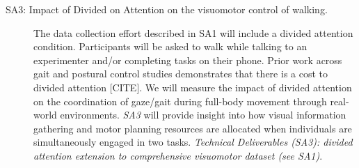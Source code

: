 \begin{description}
    \item[SA3: Impact of Divided on Attention on the visuomotor control of walking.] {The data collection effort described in SA1 will include a divided attention condition. Participants will be asked to walk while talking to an experimenter and/or completing tasks on their phone.  Prior work across gait and postural control studies demonstrates that there is a cost to divided attention [CITE]. We will measure the impact of divided attention on the coordination of gaze/gait during full-body movement through real-world environments. \textit{SA3} will provide insight into how visual information gathering and motor planning resources are allocated when individuals are simultaneously engaged in two tasks. \textit{Technical Deliverables (SA3): divided attention extension to comprehensive visuomotor dataset (see SA1)}}.

 
 
    


\end{description}

